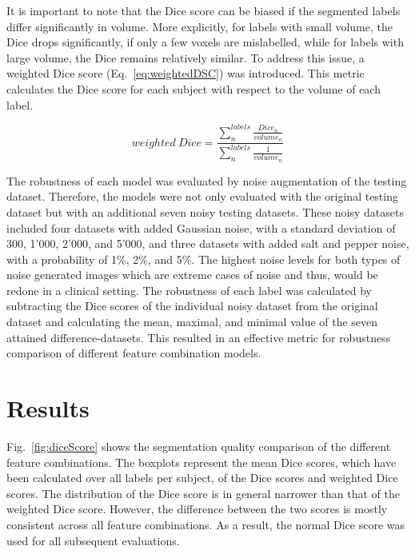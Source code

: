 \documentclass[conference]{IEEEtran}
\begin{document}
It is important to note that the Dice score can be biased if the segmented labels differ significantly in volume. More explicitly, for labels with small volume, the Dice drops significantly, if only a few voxels are mislabelled, while for labels with large volume, the Dice remains relatively similar. To address this issue, a weighted Dice score (Eq.~\ref{eq:weightedDSC}) was introduced. This metric calculates the Dice score for each subject with respect to the volume of each label.

\begin{equation} \label{eq:weightedDSC}
weighted\ Dice = \frac{\sum_{n}^{labels} \frac{Dice_n}{volume_n}}{\sum_{n}^{labels} \frac{1}{volume_n}}
\end{equation}

The robustness of each model was evaluated by noise augmentation of the testing dataset. Therefore, the models were not only evaluated with the original testing dataset but with an additional seven noisy testing datasets. These noisy datasets included four datasets with added Gaussian noise, with a standard deviation of 300, 1'000, 2'000, and 5'000, and three datasets with added salt and pepper noise, with a probability of 1\%, 2\%, and 5\%. The highest noise levels for both types of noise generated images which are extreme cases of noise and thus, would be redone in a clinical setting. The robustness of each label was calculated by subtracting the Dice scores of the individual noisy dataset from the original dataset and calculating the mean, maximal, and minimal value of the seven attained difference-datasets. This resulted in an effective metric for robustness comparison of different feature combination models.


\section{Results} \label{sec:Results}

Fig.~\ref{fig:diceScore} shows the segmentation quality comparison of the different feature combinations. The boxplots represent the mean Dice scores, which have been calculated over all labels per subject, of the Dice scores and weighted Dice scores. The distribution of the Dice score is in general narrower than that of the weighted Dice score. However, the difference between the two scores is mostly consistent across all feature combinations. As a result, the normal Dice score was used for all subsequent evaluations.
\end{document}
